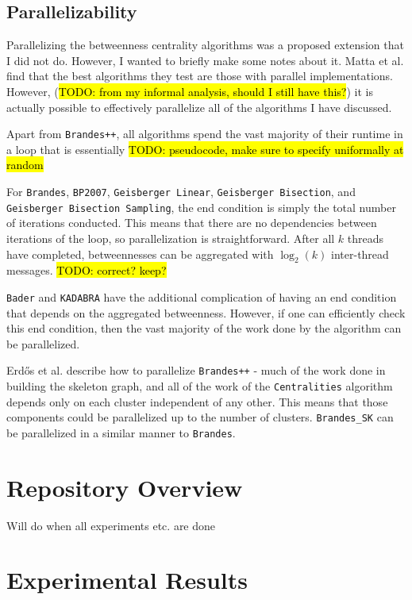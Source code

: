 \documentclass[12pt,a4paper,twoside,openright]{report}
\newcommand{\todo}[1]{\hl{TODO: #1}}
\newcommand{\ttt}[1]{\texttt{#1}}
\newcommand{\erdos}{Erd\H{o}s }
\begin{document}
		\subsection{Parallelizability}
		Parallelizing the betweenness centrality algorithms was a proposed extension that I did not do. However, I wanted to briefly make some notes about it. Matta et al. find that the best algorithms they test are those with parallel implementations. However, (\todo{from my informal analysis, should I still have this?}) it is actually possible to effectively parallelize all of the algorithms I have discussed.
		
		Apart from \ttt{Brandes++}, all algorithms spend the vast majority of their runtime in a loop that is essentially \todo{pseudocode, make sure to specify uniformally at random}
		
		For \ttt{Brandes}, \ttt{BP2007}, \ttt{Geisberger Linear}, \ttt{Geisberger Bisection}, and \ttt{Geisberger Bisection Sampling}, the end condition is simply the total number of iterations conducted. This means that there are no dependencies between iterations of the loop, so parallelization is straightforward. After all $k$ threads have completed, betweennesses can be aggregated with $\log_2(k)$ inter-thread messages. \todo{correct? keep?}
		
		\ttt{Bader} and \ttt{KADABRA} have the additional complication of having an end condition that depends on the aggregated betweenness. However, if one can efficiently check this end condition, then the vast majority of the work done by the algorithm can be parallelized.
		
		\erdos et al. describe how to parallelize \ttt{Brandes++} - much of the work done in building the skeleton graph, and all of the work of the \ttt{Centralities} algorithm depends only on each cluster independent of any other. This means that those components could be parallelized up to the number of clusters. \ttt{Brandes\_SK} can be parallelized in a similar manner to \ttt{Brandes}.
		
	\section{Repository Overview} 
	
	Will do when all experiments etc. are done
	
	
	\section{Experimental Results}
	
\end{document}
